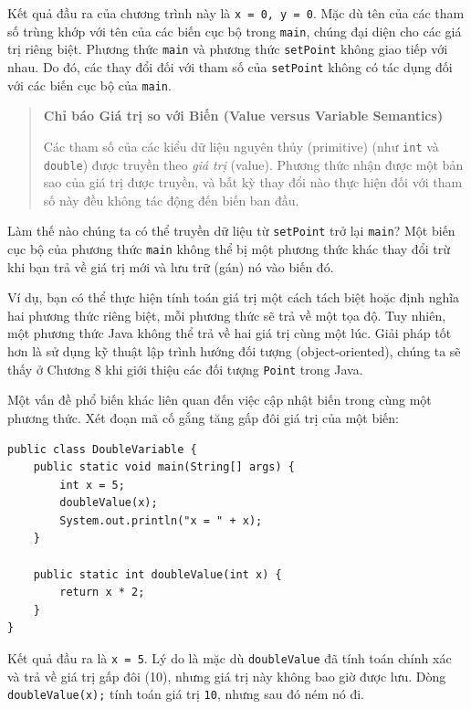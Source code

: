 Kết quả đầu ra của chương trình này là \texttt{x\ =\ 0,\ y\ =\ 0}. Mặc
dù tên của các tham số trùng khớp với tên của các biến cục bộ trong
\texttt{main}, chúng đại diện cho các giá trị riêng biệt. Phương thức
\texttt{main} và phương thức \texttt{setPoint} không giao tiếp với nhau.
Do đó, các thay đổi đối với tham số của \texttt{setPoint} không có tác
dụng đối với các biến cục bộ của \texttt{main}.

\begin{quote}
\textbf{Chỉ báo Giá trị so với Biến (Value versus Variable Semantics)}

Các tham số của các kiểu dữ liệu nguyên thủy (primitive) (như
\texttt{int} và \texttt{double}) được truyền theo \emph{giá trị}
(value). Phương thức nhận được một bản sao của giá trị được truyền, và
bất kỳ thay đổi nào thực hiện đối với tham số này đều không tác động đến
biến ban đầu.
\end{quote}

Làm thế nào chúng ta có thể truyền dữ liệu từ \texttt{setPoint} trở lại
\texttt{main}? Một biến cục bộ của phương thức \texttt{main} không thể
bị một phương thức khác thay đổi trừ khi bạn trả về giá trị mới và lưu
trữ (gán) nó vào biến đó.

Ví dụ, bạn có thể thực hiện tính toán giá trị một cách tách biệt hoặc
định nghĩa hai phương thức riêng biệt, mỗi phương thức sẽ trả về một tọa
độ. Tuy nhiên, một phương thức Java không thể trả về hai giá trị cùng
một lúc. Giải pháp tốt hơn là sử dụng kỹ thuật lập trình hướng đối tượng
(object-oriented), chúng ta sẽ thấy ở Chương 8 khi giới thiệu các đối
tượng \texttt{Point} trong Java.

Một vấn đề phổ biến khác liên quan đến việc cập nhật biến trong cùng một
phương thức. Xét đoạn mã cố gắng tăng gấp đôi giá trị của một biến:

\begin{verbatim}
public class DoubleVariable {
    public static void main(String[] args) {
        int x = 5;
        doubleValue(x);
        System.out.println("x = " + x);
    }
    
    public static int doubleValue(int x) {
        return x * 2;
    }
}
\end{verbatim}

Kết quả đầu ra là \texttt{x\ =\ 5}. Lý do là mặc dù \texttt{doubleValue}
đã tính toán chính xác và trả về giá trị gấp đôi (10), nhưng giá trị này
không bao giờ được lưu. Dòng \texttt{doubleValue(x);} tính toán giá trị
\texttt{10}, nhưng sau đó ném nó đi.

